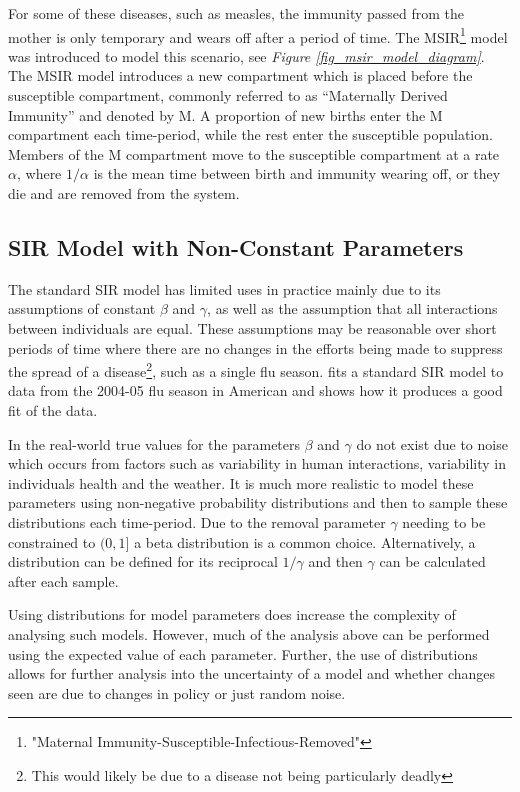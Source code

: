 \documentclass[11pt,a4paper]{article}
\theoremstyle{break}
\begin{document}
  \par For some of these diseases, such as measles, the immunity passed from the mother is only temporary and wears off after a period of time. The MSIR\footnote{"Maternal Immunity-Susceptible-Infectious-Removed"} model \cite[]{mathematics_of_infectious_diseases} was introduced to model this scenario, see \textit{Figure \ref{fig_msir_model_diagram}}. The MSIR model introduces a new compartment which is placed before the susceptible compartment, commonly referred to as ``Maternally Derived Immunity'' and denoted by M. A proportion of new births enter the M compartment each time-period, while the rest enter the susceptible population. Members of the M compartment move to the susceptible compartment at a rate $\alpha$, where $1/\alpha$ is the mean time between birth and immunity wearing off, or they die and are removed from the system.

\subsection*{SIR Model with Non-Constant Parameters}

  \par The standard SIR model has limited uses in practice mainly due to its assumptions of constant $\beta$ and $\gamma$, as well as the assumption that all interactions between individuals are equal. These assumptions may be reasonable over short periods of time where there are no changes in the efforts being made to suppress the spread of a disease\footnote{This would likely be due to a disease not being particularly deadly}, such as a single flu season. \cite[]{sir_lecture_slides} fits a standard SIR model to data from the 2004-05 flu season in American and shows how it produces a good fit of the data.

  \par In the real-world true values for the parameters $\beta$ and $\gamma$ do not exist due to noise which occurs from factors such as variability in human interactions, variability in individuals health and the weather. It is much more realistic to model these parameters using non-negative probability distributions and then to sample these distributions each time-period. Due to the removal parameter $\gamma$ needing to be constrained to $(0,1]$ a beta distribution is a common choice. Alternatively, a distribution can be defined for its reciprocal $1/\gamma$ and then $\gamma$ can be calculated after each sample.

  \par Using distributions for model parameters does increase the complexity of analysing such models. However, much of the analysis above can be performed using the expected value of each parameter. Further, the use of distributions allows for further analysis into the uncertainty of a model and whether changes seen are due to changes in policy or just random noise.
\end{document}
